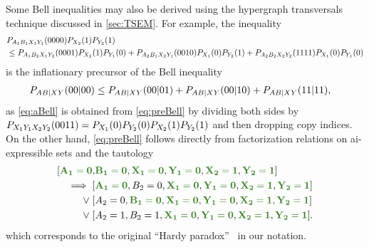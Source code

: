 \documentclass[aps,english,10pt,superscriptaddress,onecolumn,twoside,longbibliography,pra,floatfix,fleqn,nofootinbib]{revtex4-1}%
\newcommand*{\mgreen}[1]{{\color{OliveGreen}{\mathbf{#1}}}}
\theoremstyle{definition}
\newcounter{example}[section]
\newcommand{\p}[2][]{{P_{#1}}\parenths{#2}}
\newcommand{\eql}{=}
\DeclarePairedDelimiter{\parenths}{\lparen}{\rparen}
\begin{document}
Some Bell inequalities may also be derived using the hypergraph transversals technique discussed in \cref{sec:TSEM}. For example, the inequality
\begin{align}\label{eq:preBell}\begin{split}
& \p[A_1 B_1 X_1 Y_1]{0000}\p[X_2]{1} \p[Y_2]{1} \\
&\leq
 \p[A_1 B_2 X_1 Y_2]{0001}\p[X_2]{1} \p[Y_1]{0} +\p[A_2 B_1 X_2 Y_1]{0010}\p[X_1]{0}\p[Y_2]{1}+  \p[A_2 B_2 X_2 Y_2]{1111}\p[X_1]{0} \p[Y_1]{0}
\end{split}\end{align}
is the inflationary precursor of the Bell inequality
\begin{align}\label{eq:aBell}
 \p[A B | X Y]{00|00} &\leq \p[A B | X Y]{00|01} +\p[A B | X Y]{00|10}+  \p[A B | X Y]{11|11},
\end{align}
as \cref{eq:aBell} is obtained from \cref{eq:preBell} by dividing both sides by $\p[X_1 Y_1 X_2 Y_2]{0011}=\p[X_1]{0} \p[Y_2]{0}\p[X_2]{1} \p[Y_2]{1}$ and then dropping copy indices. On the other hand, \cref{eq:preBell} follows directly from factorization relations on ai-expressible sets and the tautology
\begin{align}\begin{split}
	[ \mgreen{A_1 \eql 0}, & \mgreen{B_1 \eql 0}, \mgreen{X_1 \eql 0}, \mgreen{Y_1\eql 0}, \mgreen{X_2 \eql 1}, \mgreen{Y_2 \eql 1}]\\
 \implies 
	[ & \mgreen{A_1 \eql 0}, B_2 \eql 0, \mgreen{X_1 \eql 0}, \mgreen{Y_1\eql 0}, \mgreen{X_2 \eql 1}, \mgreen{Y_2 \eql 1}] \\
	\mathrel{\lor} [ & A_2 \eql 0, \mgreen{B_1 \eql 0}, \mgreen{X_1 \eql 0}, \mgreen{Y_1\eql 0}, \mgreen{X_2 \eql 1}, \mgreen{Y_2 \eql 1}] \\
	\mathrel{\lor} [ & A_2 \eql 1, B_2 \eql 1, \mgreen{X_1 \eql 0}, \mgreen{Y_1\eql 0}, \mgreen{X_2 \eql 1}, \mgreen{Y_2 \eql 1}].
\end{split}\end{align}
which corresponds to the original ``Hardy paradox''~\cite{L.Hardy:PRL:1665} in our notation.




\renewcommand\section{\stdsection}
\let\cleardoublepage\clearpage
\setlength{\bibsep}{3pt plus 3pt minus 2pt}

\nocite{apsrev41Control}

\end{document}
